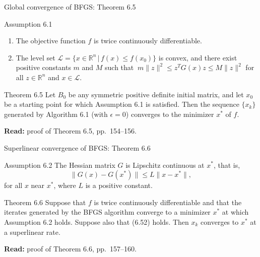 \documentclass[aspectratio=169,12pt]{beamer}
\newcommand{\R}{\mathbb{R}}
\newcommand{\xs}{x^{*}}
\newcommand{\Lcal}{\mathcal{L}}
\newcommand{\eqn}[1]{\text{\small(#1)}}
\newcommand{\readbook}[1]{{\color{red}\textbf{Read:} #1}}
\begin{document}
\begin{frame}{Global convergence of BFGS: Theorem 6.5}
  \begin{block}{Assumption 6.1}
    \begin{enumerate}\setlength\itemsep{0.1em}
      \item[(i)] The objective function $f$ is twice continuously differentiable.
      \item[(ii)] The level set $\Lcal=\{x\in\R^{n}\,|\,f(x)\le f(x_{0})\}$ is convex, and there exist
        positive constants $m$ and $M$ such that
        $\ m\|z\|^{2}\le z^{T}G(x)z\le M\|z\|^{2}$ \eqn{6.39}
        for all $z\in\R^{n}$ and $x\in\Lcal$.
    \end{enumerate}
  \end{block}

  \begin{block}{Theorem 6.5}
    Let $B_{0}$ be any symmetric positive definite initial matrix, and let $x_{0}$ be a starting
    point for which Assumption 6.1 is satisfied. Then the sequence $\{x_{k}\}$ generated by
    Algorithm 6.1 (with $\epsilon=0$) converges to the minimizer $\xs$ of $f$.
  \end{block}

  \readbook{proof of Theorem 6.5, pp.~154--156.}
\end{frame}

\begin{frame}{Superlinear convergence of BFGS: Theorem 6.6}
  \begin{block}{Assumption 6.2}
    The Hessian matrix $G$ is Lipschitz continuous at $\xs$, that is,
    \[ \|G(x)-G(\xs)\|\le L\|x-\xs\| , \]
    for all $x$ near $\xs$, where $L$ is a positive constant.
  \end{block}

  \begin{block}{Theorem 6.6}
    Suppose that $f$ is twice continuously differentiable and that the iterates generated by
    the BFGS algorithm converge to a minimizer $\xs$ at which Assumption 6.2 holds. Suppose
    also that (6.52) holds. Then $x_{k}$ converges to $\xs$ at a superlinear rate.
  \end{block}

  \readbook{proof of Theorem 6.6, pp.~157--160.}
\end{frame}
\end{document}
